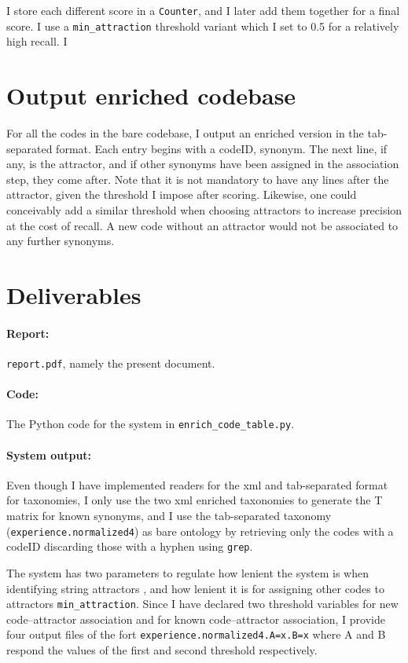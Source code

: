 \documentclass[12pt]{article}%
\begin{document}
I store each different score in a \texttt{Counter}, and I later add them together for a final score. I use a \texttt{min\_attraction} threshold variant which I set to 0.5 for a relatively high recall. I 

\section{Output enriched codebase}
For all the codes in the bare codebase, I output an enriched version in the tab-separated format. Each entry begins with a codeID, synonym. The next line, if any, is the attractor, and if other synonyms have been assigned in the association step, they come after. Note that it is not mandatory to have any lines after the attractor, given the threshold I impose after scoring. Likewise, one could conceivably add a similar threshold when choosing attractors to increase precision at the cost of recall. A new code without an attractor would not be associated to any further synonyms.

\section{Deliverables}

\paragraph{Report:} \texttt{report.pdf}, namely the present document.

\paragraph{Code:} The Python code for the system in \texttt{enrich\_code\_table.py}. 

\paragraph{System output:}  Even though I have implemented readers for the xml and tab-separated format for taxonomies, I only use the two xml enriched taxonomies to generate the T matrix for known synonyms, and I use the tab-separated taxonomy (\texttt{experience.normalized4}) as bare ontology by retrieving only the codes with a codeID discarding those with a hyphen using \texttt{grep}.

 The system has two parameters to regulate how lenient the system is when identifying string attractors , and how lenient it is for assigning other codes to attractors \texttt{min\_attraction}. Since I have declared two threshold variables for new code--attractor association and for known code--attractor association, I provide four output files of the fort \texttt{experience.normalized4.A=x.B=x} where A and B respond the values of the first and second threshold respectively. 
 
\end{document}
